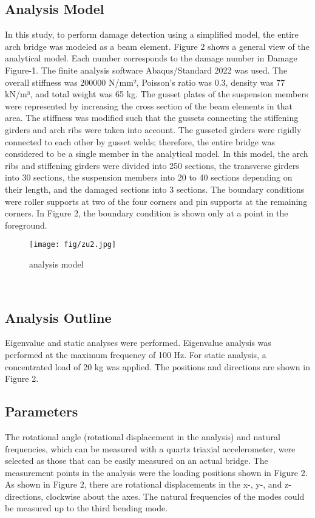 \documentclass{proc-a4}
\begin{document}
\subsection{Analysis Model}
In this study, to perform damage detection using a simplified model, the entire arch bridge was modeled as a beam element. Figure 2 shows a general view of the analytical model. Each number corresponds to the damage number in Damage Figure-1. The finite analysis software Abaqus/Standard 2022 was used. The overall stiffness was 200000 N/mm², Poisson's ratio was 0.3, density was 77 kN/m³, and total weight was 65 kg. The gusset plates of the suspension members were represented by increasing the cross section of the beam elements in that area. The stiffness was modified such that the gussets connecting the stiffening girders and arch ribs were taken into account. The gusseted girders were rigidly connected to each other by gusset welds; therefore, the entire bridge was considered to be a single member in the analytical model. In this model, the arch ribs and stiffening girders were divided into 250 sections, the transverse girders into 30 sections, the suspension members into 20 to 40 sections depending on their length, and the damaged sections into 3 sections. The boundary conditions were roller supports at two of the four corners and pin supports at the remaining corners. In Figure 2, the boundary condition is shown only at a point in the foreground.
 \begin{figure}[htbp]
            \centering
            \texttt{[image: fig/zu2.jpg]}
            \caption{analysis model}
    \end{figure} \\

\subsection{Analysis Outline}
Eigenvalue and static analyses were performed. Eigenvalue analysis was performed at the maximum frequency of 100 Hz. For static analysis, a concentrated load of 20 kg was applied. The positions and directions are shown in Figure 2.

\subsection{Parameters}
The rotational angle (rotational displacement in the analysis) and natural frequencies, which can be measured with a quartz triaxial accelerometer, were selected as those that can be easily measured on an actual bridge. The measurement points in the analysis were the loading positions shown in Figure 2. As shown in Figure 2, there are rotational displacements in the x-, y-, and z-directions, clockwise about the axes. The natural frequencies of the modes could be measured up to the third bending mode.
\end{document}
